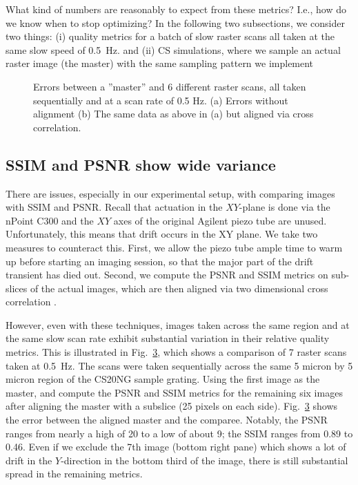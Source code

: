 \documentclass[11pt]{article}
\begin{document}
What kind of numbers are reasonably to expect from these metrics? I.e., how do we know when to stop optimizing? In the following two subsections,  we consider two things: (i) quality metrics for a batch of slow raster scans all taken at the same slow speed of 0.5~Hz. and (ii) CS simulations, where we sample an actual raster image (the master) with the same sampling pattern we implement 

\begin{figure}
  \begin{subfigure}{.48\textwidth}
    
    \caption{}
    \label{fig:rast_unaligned}
  \end{subfigure}
  \begin{subfigure}{.48\textwidth}
    
      \caption{}
    \label{fig:baseline_errors_aligned}
  \end{subfigure}
  \caption{Errors between a ''master'' and 6 different raster scans, all taken sequentially and at a scan rate of 0.5 Hz. (a) Errors without alignment (b) The same data as above in (a) but aligned via cross correlation.}
  \label{fig:baseline_errors}
\end{figure}

\subsection{SSIM and PSNR show wide variance}
There are issues, especially in our experimental setup, with comparing images with SSIM and PSNR. Recall that actuation in the $XY$-plane is done via the nPoint C300 and the $XY$ axes of the original Agilent piezo tube are unused. Unfortunately, this means that drift occurs in the XY plane. We take two measures to counteract this. First, we allow the piezo tube ample time to warm up before starting an imaging session, so that the major part of the drift transient has died out. Second, we compute the PSNR and SSIM metrics on sub-slices of the actual images, which are then aligned via two dimensional cross correlation \cite{mw_xcorr2}. 

However, even with these techniques, images taken across the same region and at the same slow scan rate exhibit substantial variation in their relative quality metrics. This is illustrated in Fig.~\ref{fig:baseline_errors}, which shows a comparison of 7 raster scans taken at 0.5~Hz. The scans were taken sequentially across the same 5 micron by 5 micron region of the CS20NG sample grating. Using the first image as the master, and compute the PSNR and SSIM metrics for the remaining six images after aligning the master with a subslice (25 pixels on each side). Fig.~\ref{fig:baseline_errors} shows the error between the aligned master and the comparee. Notably, the PSNR ranges from nearly a high of 20 to a low of about 9; the SSIM ranges from 0.89 to 0.46. Even if we exclude the 7th image (bottom right pane) which shows a lot of drift in the $Y$-direction in the bottom third of the image, there is still substantial spread in the remaining metrics. 
\end{document}
